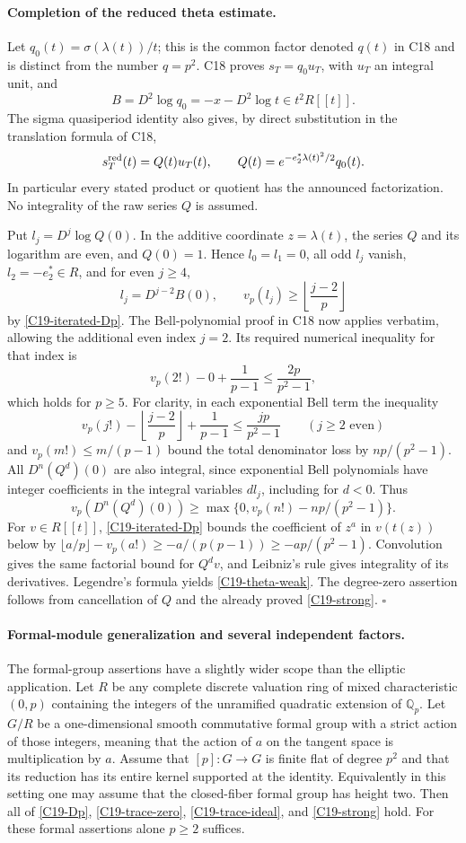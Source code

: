 \documentclass[11pt]{article}
\newcommand{\Q}{\mathbb Q}\newcommand{\C}{\mathbb C}\newcommand{\Z}{\mathbb Z}\newcommand{\R}{\mathbb R}\newcommand{\A}{\mathbb A}\newcommand{\OO}{\mathcal O}
\theoremstyle{definition}\newtheorem{definition}[theorem]{Definition}\newtheorem{remark}[theorem]{Remark}
\begin{document}
\paragraph{Completion of the reduced theta estimate.}
Let $q_0(t)=\sigma(\lambda(t))/t$; this is the common factor
denoted $q(t)$ in C18 and is distinct from the number $q=p^2$.
C18 proves $s_T=q_0u_T$, with $u_T$ an integral unit, and
\[
 B=D^2\log q_0=-x-D^2\log t\in t^2R[[t]].
\]
The sigma quasiperiod identity also gives, by direct substitution
in the translation formula of C18,
\[
 s_T^{\rm red}(t)=Q(t)u_T(t),\qquad
 Q(t)=e^{-e_2^*\lambda(t)^2/2}q_0(t).
\]
In particular every stated product or quotient has the announced
factorization.  No integrality of the raw series $Q$ is assumed.

Put $l_j=D^j\log Q(0)$.  In the additive coordinate
$z=\lambda(t)$, the series $Q$ and its logarithm are even,
and $Q(0)=1$.  Hence $l_0=l_1=0$, all odd $l_j$ vanish,
$l_2=-e_2^*\in R$, and for even $j\geq4$,
\[
 l_j=D^{j-2}B(0),\qquad
 v_p(l_j)\geq\left\lfloor\frac{j-2}{p}\right\rfloor
\]
by \eqref{C19-iterated-Dp}.
The Bell-polynomial proof in C18 now applies verbatim, allowing
the additional even index $j=2$.  Its required numerical
inequality for that index is
\[
 v_p(2!)-0+\frac1{p-1}
       \leq\frac{2p}{p^2-1},
\]
which holds for $p\geq5$.  For clarity, in each exponential
Bell term the inequality
\[
 v_p(j!)-\left\lfloor\frac{j-2}{p}\right\rfloor
       +\frac1{p-1}\leq\frac{jp}{p^2-1}
       \qquad(j\geq2\text{ even})
\]
and $v_p(m!)\leq m/(p-1)$ bound the total denominator loss
by $np/(p^2-1)$.  All $D^n(Q^d)(0)$ are also integral,
since exponential Bell polynomials have integer coefficients
in the integral variables $d l_j$, including for $d<0$.
Thus
\[
 v_p(D^n(Q^d)(0))
       \geq\max\{0,v_p(n!)-np/(p^2-1)\}.
\]
For $v\in R[[t]]$, \eqref{C19-iterated-Dp} bounds the
coefficient of $z^a$ in $v(t(z))$ below by
$\lfloor a/p\rfloor-v_p(a!)\geq-a/(p(p-1))
\geq-ap/(p^2-1)$.
Convolution gives the same factorial bound for $Q^dv$,
and Leibniz's rule gives integrality of its derivatives.
Legendre's formula yields \eqref{C19-theta-weak}.
The degree-zero assertion follows from cancellation of $Q$
and the already proved \eqref{C19-strong}.
\hfill$\square$

\paragraph{Formal-module generalization and several independent factors.}
The formal-group assertions have a slightly wider scope than
the elliptic application.  Let $R$ be any complete discrete
valuation ring of mixed characteristic $(0,p)$ containing
the integers of the unramified quadratic extension of $\Q_p$.
Let $G/R$ be a one-dimensional smooth commutative formal group
with a strict action of those integers, meaning that the action
of $a$ on the tangent space is multiplication by $a$.
Assume that $[p]:G\to G$ is finite flat of degree $p^2$ and
that its reduction has its entire kernel supported at the
identity.  Equivalently in this setting one may assume that
the closed-fiber formal group has height two.
Then all of \eqref{C19-Dp}, \eqref{C19-trace-zero},
\eqref{C19-trace-ideal}, and \eqref{C19-strong} hold.
For these formal assertions alone $p\geq2$ suffices.
\end{document}
